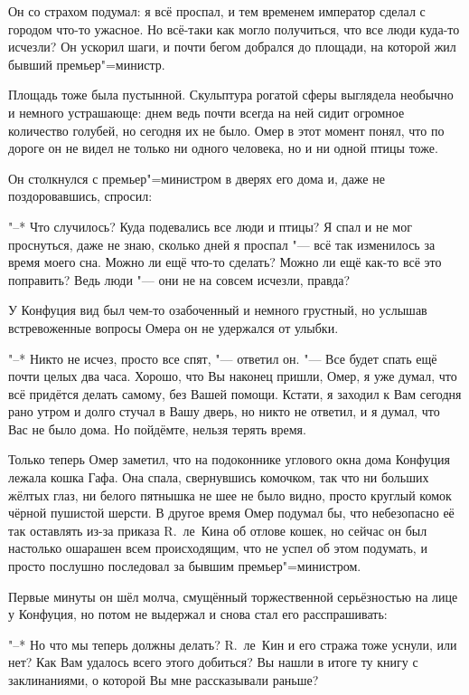 Он со страхом подумал: я всё проспал, и тем временем император сделал с городом
что-то ужасное.
Но всё-таки как могло получиться, что все люди куда-то исчезли?
Он ускорил шаги, и почти бегом добрался до площади, на которой жил бывший
премьер"=министр.

Площадь тоже была пустынной.
Скульптура рогатой сферы выглядела необычно и немного устрашающе: днем ведь
почти всегда на ней сидит огромное количество голубей, но сегодня их не было.
Омер в этот момент понял, что по дороге он не видел не только ни одного человека,
но и ни одной птицы тоже.

Он столкнулся с премьер"=министром в дверях его дома и, даже не поздоровавшись,
спросил:

"--* Что случилось?
Куда подевались все люди и птицы?
Я спал и не мог проснуться, даже не знаю, сколько дней я проспал "--- всё так
изменилось за время моего сна.
Можно ли ещё что-то сделать?
Можно ли ещё как-то всё это поправить?
Ведь люди "--- они не на совсем исчезли, правда?

У Конфуция вид был чем-то озабоченный и немного грустный, но услышав
встревоженные вопросы Омера он не удержался от улыбки.

"--* Никто не исчез, просто все спят, "--- ответил он.
"--- Все будет спать ещё почти целых два часа.
Хорошо, что Вы наконец пришли, Омер, я уже думал, что всё придётся делать
самому, без Вашей помощи.
Кстати, я заходил к Вам сегодня рано утром и долго стучал в Вашу дверь, но никто
не ответил, и я думал, что Вас не было дома.
Но пойдёмте, нельзя терять время.

Только теперь Омер заметил, что на подоконнике углового окна дома Конфуция
лежала кошка Гафа.
Она спала, свернувшись комочком, так что ни больших жёлтых глаз, ни белого
пятнышка не шее не было видно, просто круглый комок чёрной пушистой шерсти.
В другое время Омер подумал бы, что небезопасно её так оставлять из-за приказа
R.~ле~Кина об отлове кошек, но сейчас он был настолько ошарашен всем
происходящим, что не успел об этом подумать, и просто послушно последовал за
бывшим премьер"=министром.

Первые минуты он шёл молча, смущённый торжественной серьёзностью на лице у
Конфуция, но потом не выдержал и снова стал его расспрашивать:

"--* Но что мы теперь должны делать?
R.~ле~Кин и его стража тоже уснули, или нет?
Как Вам удалось всего этого добиться?
Вы нашли в итоге ту книгу с заклинаниями, о которой Вы мне рассказывали раньше?

